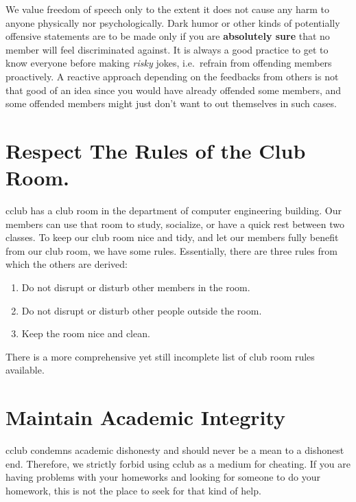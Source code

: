 \documentclass{article}
\begin{document}
We value freedom of speech only to the extent it does not cause any harm to
anyone physically nor psychologically. Dark humor or other kinds of potentially
offensive statements are to be made only if you are \textbf{absolutely sure}
that no member will feel discriminated against. It is always a good practice to
get to know everyone before making \textit{risky} jokes, i.e.\ refrain from
offending members proactively.  A reactive approach depending on the feedbacks
from others is not that good of an idea since you would have already offended
some members, and some offended members might just don't want to out themselves
in such cases.

\section*{Respect The Rules of the Club Room.}
cclub has a club room in the department of computer engineering building. Our
members can use that room to study, socialize, or have a quick rest between two
classes. To keep our club room nice and tidy, and let our members fully benefit
from our club room, we have some rules. Essentially, there are three rules from
which the others are derived:
\begin{enumerate}
		\item Do not disrupt or disturb other members in the room.
		\item Do not disrupt or disturb other people outside the room.
		\item Keep the room nice and clean.
\end{enumerate}

There is a more comprehensive yet still incomplete list of club room rules available.

\section*{Maintain Academic Integrity}
cclub condemns academic dishonesty and should never be a mean to a dishonest end. Therefore, we strictly forbid using cclub as a medium for cheating. If you are having problems with your homeworks and looking for someone to do your homework, this is not the place to seek for that kind of help.
\end{document}
